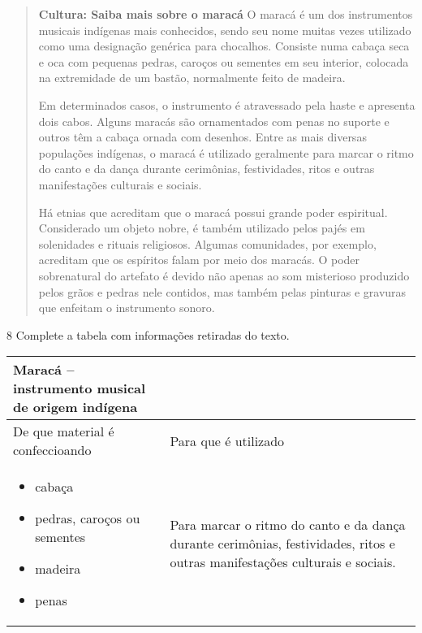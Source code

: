 \begin{quote}
\textbf{Cultura: Saiba mais sobre o maracá}
O maracá é um dos instrumentos musicais indígenas mais conhecidos, sendo
seu nome muitas vezes utilizado como uma designação genérica para
chocalhos. Consiste numa cabaça seca e oca com pequenas pedras, caroços
ou sementes em seu interior, colocada na extremidade de um bastão,
normalmente feito de madeira.

Em determinados casos, o instrumento é atravessado pela haste e
apresenta dois cabos. Alguns maracás são ornamentados com penas no
suporte e outros têm a cabaça ornada com desenhos. Entre as mais
diversas populações indígenas, o maracá é utilizado geralmente para
marcar o ritmo do canto e da dança durante cerimônias, festividades,
ritos e outras manifestações culturais e sociais.

Há etnias que acreditam que o maracá possui grande poder espiritual. Considerado um objeto nobre, é também utilizado pelos pajés em solenidades e rituais religiosos. Algumas comunidades, por exemplo, acreditam que os espíritos falam por meio dos maracás. O poder sobrenatural do artefato é devido não apenas ao som misterioso produzido pelos grãos e pedras nele contidos, mas também pelas pinturas e gravuras que enfeitam o instrumento sonoro.

\end{quote}

\num{8}  Complete a tabela com informações retiradas do texto.

\begin{longtable}[]{@{}ll@{}}
\toprule
\textbf{Maracá -- instrumento musical de origem indígena}\tabularnewline
\midrule
\endhead
De que material é confeccioando & Para que é utilizado\tabularnewline
\begin{minipage}[t]{0.48\columnwidth}\raggedright\strut
\begin{itemize}
\item
  cabaça
\item
  pedras, caroços ou sementes
\item
  madeira
\item
  penas
\end{itemize}\strut
\end{minipage} & \begin{minipage}[t]{0.48\columnwidth}\raggedright\strut
Para marcar o ritmo do canto e da dança durante cerimônias,
festividades, ritos e outras manifestações culturais e sociais.\strut
\end{minipage}\tabularnewline
\bottomrule
\end{longtable}


